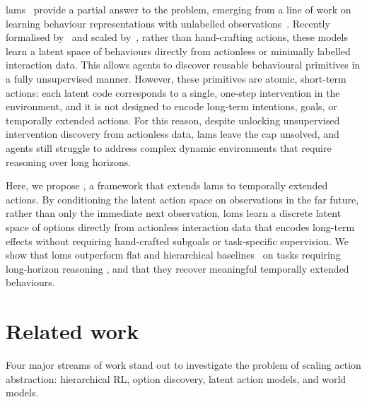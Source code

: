\documentclass{article}
\theoremstyle{postulate}
\begin{document}
\glspl{lam}~\citep{ha2018world} provide a partial answer to the problem, emerging from a line of work on learning behaviour representations with unlabelled observations~\citep{rybkin2019clasp,edwards2019ilpo}.
Recently formalised by~\citet{schmidt2024lapo} and scaled by~\citet{bruce2024genie,ye2023ficc}, rather than hand-crafting actions, these models learn a latent space of behaviours directly from actionless or minimally labelled interaction data.
This allows agents to discover reusable behavioural primitives in a fully unsupervised manner.
However, these primitives are atomic, short-term actions: each latent code corresponds to a single, one-step intervention in the environment, and it is not designed to encode long-term intentions, goals, or temporally extended actions.
For this reason, despite unlocking unsupervised intervention discovery from actionless data, \glspl{lam} leave the \gls{cap} unsolved, and agents still struggle to address complex dynamic environments that require reasoning over long horizons.

Here, we propose , a framework that extends \glspl{lam} to temporally extended actions.
By conditioning the latent action space on observations in the far future, rather than only the immediate next observation, \glspl{lom} learn a discrete latent space of options directly from actionless interaction data that encodes long-term effects without requiring hand-crafted subgoals or task-specific supervision.
We show that \glspl{lom} outperform flat and hierarchical baselines~\citep{klissarovdoro2023motif,klissarov2023dceo} on tasks requiring long-horizon reasoning \citep{paglieri2024balrog}, and that they recover meaningful temporally extended behaviours.









\section{Related work}
\label{sec:related-works}
Four major streams of work stand out to investigate the problem of scaling action abstraction: hierarchical RL, option discovery, latent action models, and world models.
\end{document}
